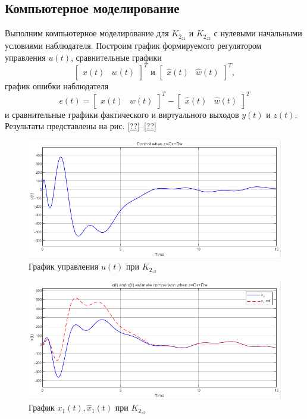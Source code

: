 \documentclass[a4paper, 12pt]{article}
\begin{document}
    \subsection{Компьютерное моделирование}
    Выполним компьютерное моделирование для $K_{2_{z1}}$ и $K_{2_{z2}}$
    с нулевыми начальными условиями наблюдателя. Построим график
    формируемого регулятором управления $u(t)$, сравнительные графики
    $$\begin{bmatrix}
        x(t) &w(t)
    \end{bmatrix}^T\text{ и }\begin{bmatrix}
        \hat{x}(t) &\hat{w}(t)
    \end{bmatrix}^T,$$ график ошибки наблюдателя $$e(t)=\begin{bmatrix}
        x(t) &w(t)
    \end{bmatrix}^T-\begin{bmatrix}
        \hat{x}(t) &\hat{w}(t)
    \end{bmatrix}^T$$ и сравнительные графики фактического и виртуального выходов $y(t)$ и $z(t)$.
    Результаты представлены на рис. \ref{??}--\ref{??}
    \begin{figure}[H]
        \centering
        \includegraphics[scale=0.75]{3task_ucd.png}
        \captionsetup{skip=0pt}
        \caption{График управления $u(t)$ при $K_{2_{z2}}$}
        \label{fig:3task_ucd}
    \end{figure}
    \begin{figure}[H]
        \centering
        \includegraphics[scale=0.75]{3task_xxh1cd.png}
        \captionsetup{skip=0pt}
        \caption{График $x_1(t),\hat{x}_1(t)$ при $K_{2_{z2}}$}
        \label{fig:3task_xxh1cd}
    \end{figure}
\end{document}
